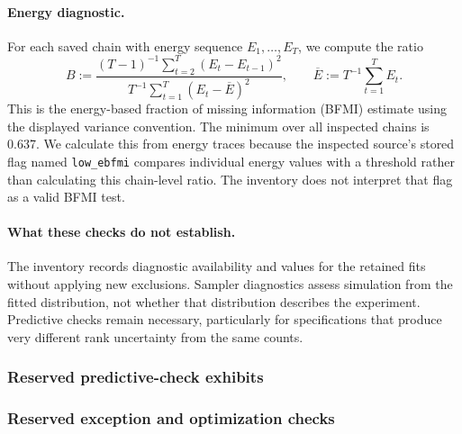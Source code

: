 \paragraph{Energy diagnostic.}
For each saved chain with energy sequence $E_1,\ldots,E_T$, we compute the
ratio
\[
B:=\frac{(T-1)^{-1}\sum_{t=2}^T(E_t-E_{t-1})^2}
{T^{-1}\sum_{t=1}^T(E_t-\overline E)^2},
\qquad \overline E:=T^{-1}\sum_{t=1}^T E_t.
\]
This is the energy-based fraction of missing information (BFMI) estimate
using the displayed variance convention. The minimum over all inspected
chains is 0.637. We calculate this from energy traces because the inspected
source's stored flag named \texttt{low\_ebfmi} compares individual energy
values with a threshold rather than calculating this chain-level ratio.
The inventory does not interpret that flag as a valid BFMI test.

\paragraph{What these checks do not establish.}
The inventory records diagnostic availability and values for the retained
fits without applying new exclusions. Sampler diagnostics assess simulation
from the fitted distribution, not whether that distribution describes the
experiment. Predictive checks remain necessary, particularly for specifications
that produce very different rank uncertainty from the same counts.

\subsubsection{Reserved predictive-check exhibits}

\subsubsection{Reserved exception and optimization checks}

